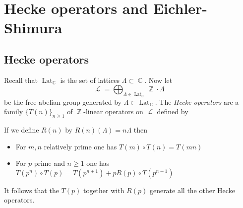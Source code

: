 \documentclass[paper=a4, fontsize=11pt]{scrartcl}
\DeclareMathOperator{\Z}{\mathbb{Z}}
\DeclareMathOperator{\Lat}{\text{Lat}}
\DeclareMathOperator{\C}{\mathbb{C}}
\DeclareMathOperator{\LLL}{\mathcal{L}}
\numberwithin{equation}{section}
\numberwithin{figure}{section}
\numberwithin{table}{section}
\begin{document}
\section{Hecke operators and Eichler-Shimura}
\subsection{Hecke operators}
Recall that $\Lat_{\C}$ is the set of lattices $\Lambda\subset \C$. Now let $$\LLL=\bigoplus_{\Lambda\in\Lat_{\C}}\Z\cdot\Lambda$$ be the free abelian group generated by $\Lambda\in\Lat_{\C}$. The \textit{Hecke operators} are a family $\{T(n)\}_{n\geq 1}$ of $\Z$-linear operators on $\LLL$ defined by
\begin{center}
\end{center}
If we define $R(n)$ by $R(n)(\Lambda)=n\Lambda$ then
\begin{itemize}
\item For $m,n$ relatively prime one has $T(m)\circ T(n)=T(mn)$
\item For $p$ prime and $n\geq 1$ one has $T(p^n)\circ T(p)=T(p^{n+1})+pR(p)\circ T(p^{n-1})$
\end{itemize}
It follows that the $T(p)$ together with $R(p)$ generate all the other Hecke operators.
\end{document}
